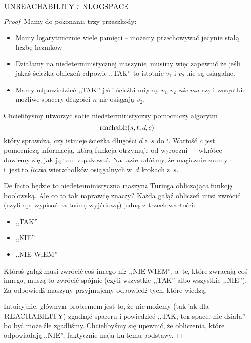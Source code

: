 \begin{theorem}
	\( \textsc{UNREACHABILITY} \in \textsc{NLOGSPACE} \)
\end{theorem}
\begin{proof}
	Mamy do pokonania trzy przeszkody:
	\begin{itemize}
		\item Mamy logarytmicznie wiele pamięci -- możemy przechowywać jedynie stałą liczbę liczników.

		\item Działamy na niedeterministycznej maszynie, musimy więc zapewnić że jeśli jakaś ścieżka obliczeń odpowie ,,TAK'' to istotnie \( v_1 \) i \( v_2 \) nie są osiągalne.

		\item Mamy odpowiedzieć ,,TAK'' jeśli ścieżki między \( v_1, v_2 \) \textit{nie ma} czyli wszystkie możliwe spacery długości \( n \) nie osiągają \( v_2 \).
	\end{itemize}

	Chcielibyśmy utworzyć sobie niedeterministyczny pomocniczy algorytm
	\[
		\textrm{reachable}\pars{s, t, d, c}
	\]
	który sprawdza, czy istnieje ścieżka długości \(d\) z~\(s\) do \(t\). Wartość \(c\) jest pomocniczą informacją, którą funkcja otrzymuje od wyroczni --- wkrótce dowiemy się, jak ją tam zapakować. Na razie załóżmy, że magicznie znamy \(c\) i~jest to \emph{liczba} wierzchołków osiągalnych w~\(d\) krokach z~\(s\).

	De facto będzie to niedeterministyczna maszyna Turinga obliczająca funkcję boolowską. Ale co to tak naprawdę znaczy? Każda gałąź obliczeń musi zwrócić (czyli np. wypisać na taśmę wyjściową) jedną z~trzech wartości:
	\begin{itemize}
		\item ,,TAK''
		\item ,,NIE''
		\item ,,NIE WIEM''
	\end{itemize}
	Któraś gałąź musi zwrócić coś innego niż ,,NIE WIEM'', a~te, które zwracają coś innego, muszą to zwrócić spójnie (czyli wszystkie ,,TAK'' albo wszystkie ,,NIE''). Za odpowiedź maszyny przyjmujemy odpowiedź tych, które wiedzą.

	Intuicyjnie, głównym problemem jest to, że nie możemy (tak jak dla \(\textsc{REACHABILITY}\)) zgadnąć spaceru i powiedzieć ,,TAK, ten spacer nie działa'' bo być może źle zgadliśmy. Chcielibyśmy się upewnić, że obliczenia, które odpowiadają ,,NIE'', faktycznie mają ku temu podstawy.


\end{proof}
